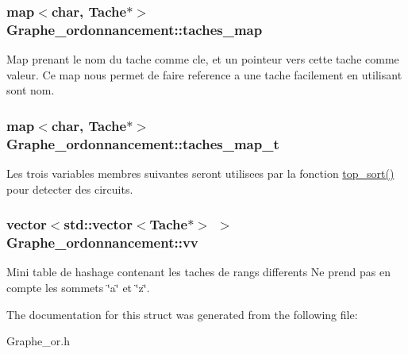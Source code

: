 \subsubsection[{\texorpdfstring{taches\+\_\+map}{taches_map}}]{\setlength{\rightskip}{0pt plus 5cm}map$<$char, {\bf Tache}$\ast$$>$ Graphe\+\_\+ordonnancement\+::taches\+\_\+map}\hypertarget{structGraphe__ordonnancement_ae3827ffef7da6cfa9310c1329ba388ea}{}\label{structGraphe__ordonnancement_ae3827ffef7da6cfa9310c1329ba388ea}
Map prenant le nom du tache comme cle, et un pointeur vers cette tache comme valeur. Ce map nous permet de faire reference a une tache facilement en utilisant sont nom. 
\subsubsection[{\texorpdfstring{taches\+\_\+map\+\_\+t}{taches_map_t}}]{\setlength{\rightskip}{0pt plus 5cm}map$<$char, {\bf Tache}$\ast$$>$ Graphe\+\_\+ordonnancement\+::taches\+\_\+map\+\_\+t}\hypertarget{structGraphe__ordonnancement_a194953cc290bf1c5c29ae162b988f422}{}\label{structGraphe__ordonnancement_a194953cc290bf1c5c29ae162b988f422}
Les trois variables membres suivantes seront utilisees par la fonction \hyperlink{structGraphe__ordonnancement_af2662be9ddd82e173a4c82977a032004}{top\+\_\+sort()} pour detecter des circuits. 
\subsubsection[{\texorpdfstring{vv}{vv}}]{\setlength{\rightskip}{0pt plus 5cm}vector$<$std\+::vector$<${\bf Tache}$\ast$$>$ $>$ Graphe\+\_\+ordonnancement\+::vv}\hypertarget{structGraphe__ordonnancement_a2e79a72fc442a1b9ea9734d40905d300}{}\label{structGraphe__ordonnancement_a2e79a72fc442a1b9ea9734d40905d300}
Mini table de hashage contenant les taches de rangs differents Ne prend pas en compte les sommets \char`\"{}a\char`\"{} et \char`\"{}z\char`\"{}. 

The documentation for this struct was generated from the following file\+:\begin{DoxyCompactItemize}
\item 
Graphe\+\_\+or.\+h\end{DoxyCompactItemize}
